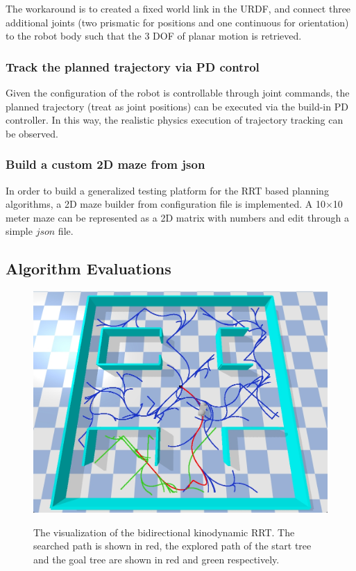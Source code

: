 \documentclass[11pt, conference]{IEEEtran}
\begin{document}
The workaround is to created a fixed world link in the URDF, and connect three additional joints (two prismatic for positions and one continuous for orientation) to the robot body such that the 3 DOF of planar motion is retrieved.

\subsubsection{Track the planned trajectory via PD control}
Given the configuration of the robot is controllable through joint commands, the planned trajectory (treat as joint positions) can be executed via the build-in PD controller. In this way, the realistic physics execution of trajectory tracking can be observed.


\subsubsection{Build a custom 2D maze from json}
In order to build a generalized testing platform for the RRT based planning algorithms, a 2D maze builder from configuration file is implemented. A 10$\times$10 meter maze can be represented as a 2D matrix with numbers and edit through a simple $json$ file.

\subsection{Algorithm Evaluations}

\begin{figure}[htb]
    \centering
        \textsf{\includegraphics[width=0.9\columnwidth]{figures/BiKdRRT.png}}
        \caption{The visualization of the bidirectional kinodynamic RRT. The searched path is shown in red, the explored path of the start tree and the goal tree are shown in red and green respectively.}
        \label{fig:bi-kd-rrt}
\end{figure}
\end{document}
